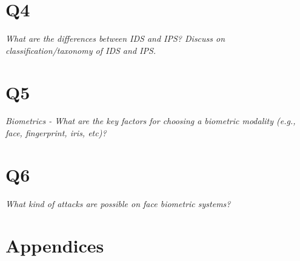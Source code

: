\documentclass{article}
\begin{document}
\newpage
\section{Q4}
\begin{tcolorbox}
  \textit{What are the differences between IDS and IPS? Discuss on classification/taxonomy of IDS and IPS.}
\end{tcolorbox}





\section{Q5}
\begin{tcolorbox}
  \textit{Biometrics - What are the key factors for choosing a biometric modality (e.g., face, fingerprint, iris, etc)?}
\end{tcolorbox}


\section{Q6}
\begin{tcolorbox}
  \textit{What kind of attacks are possible on face biometric systems?}
\end{tcolorbox}










\section{Appendices}


\newpage

\nocite{*}



\end{document}

